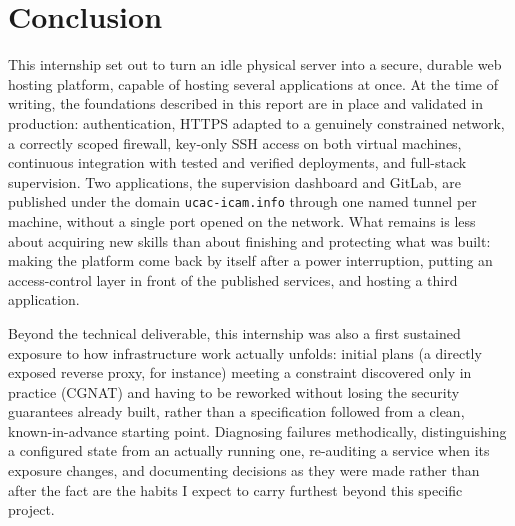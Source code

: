 \chapter*{Conclusion}

This internship set out to turn an idle physical server into a secure, durable web hosting platform, capable of hosting several applications at once. At the time of writing, the foundations described in this report are in place and validated in production: authentication, HTTPS adapted to a genuinely constrained network, a correctly scoped firewall, key-only SSH access on both virtual machines, continuous integration with tested and verified deployments, and full-stack supervision. Two applications, the supervision dashboard and GitLab, are published under the domain \texttt{ucac-icam.info} through one named tunnel per machine, without a single port opened on the network. What remains is less about acquiring new skills than about finishing and protecting what was built: making the platform come back by itself after a power interruption, putting an access-control layer in front of the published services, and hosting a third application.

Beyond the technical deliverable, this internship was also a first sustained exposure to how infrastructure work actually unfolds: initial plans (a directly exposed reverse proxy, for instance) meeting a constraint discovered only in practice (CGNAT) and having to be reworked without losing the security guarantees already built, rather than a specification followed from a clean, known-in-advance starting point. Diagnosing failures methodically, distinguishing a configured state from an actually running one, re-auditing a service when its exposure changes, and documenting decisions as they were made rather than after the fact are the habits I expect to carry furthest beyond this specific project.

\clearpage
